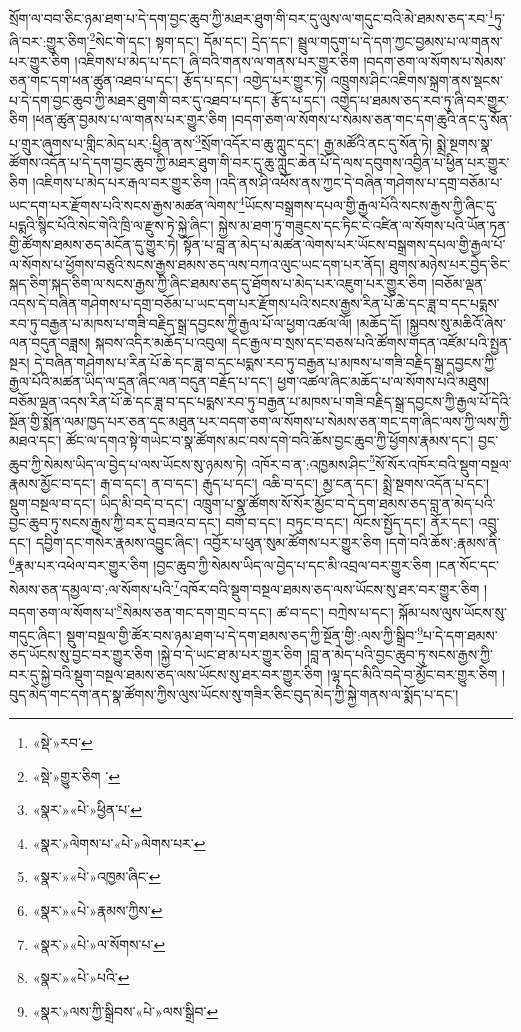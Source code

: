 སྲོག་ལ་བབ་ཅིང་ཉམ་ཐག་པ་དེ་དག་བྱང་ཆུབ་ཀྱི་མཐར་ཐུག་གི་བར་དུ་ལུས་ལ་གདུང་བའི་མེ་ཐམས་ཅད་རབ་\footnote{«སྡེ་»རབ་}ཏུ་ཞི་བར་:གྱུར་ཅིག་\footnote{«སྡེ་»གྱུར་ཅིག ་}སེང་གེ་དང་། སྟག་དང་། དོམ་དང་། དྲེད་དང་། སྦྲུལ་གདུག་པ་དེ་དག་ཀྱང་བྱམས་པ་ལ་གནས་པར་གྱུར་ཅིག །འཇིགས་པ་མེད་པ་དང་། ཞི་བའི་གནས་ལ་གནས་པར་གྱུར་ཅིག །བདག་ཅག་ལ་སོགས་པ་སེམས་ཅན་གང་དག་ཕན་ཚུན་འཐབ་པ་དང་། རྩོད་པ་དང་། འགྱེད་པར་གྱུར་ཏེ། འཁྲུགས་ཤིང་འཇིགས་སྐྲག་ནས་སྡངས་པ་དེ་དག་བྱང་ཆུབ་ཀྱི་མཐར་ཐུག་གི་བར་དུ་འཐབ་པ་དང་། རྩོད་པ་དང་། འགྱེད་པ་ཐམས་ཅད་རབ་ཏུ་ཞི་བར་གྱུར་ཅིག །ཕན་ཚུན་བྱམས་པ་ལ་གནས་པར་གྱུར་ཅིག །བདག་ཅག་ལ་སོགས་པ་སེམས་ཅན་གང་དག་ཆུའི་ནང་དུ་སོན་པ་གྲུར་ཞུགས་པ་གླིང་མེད་པར་:ཕྱིན་ནས་\footnote{«སྣར་»«པེ་»ཕྱིན་པ་}སྲོག་འདོར་བ་ཆུ་ཀླུང་དང་། རྒྱ་མཚོའི་ནང་དུ་སོན་ཏེ། སྨྲེ་སྔགས་སྣ་ཚོགས་འདོན་པ་དེ་དག་བྱང་ཆུབ་ཀྱི་མཐར་ཐུག་གི་བར་དུ་ཆུ་ཀླུང་ཆེན་པོ་དེ་ལས་དབུགས་འབྱིན་པ་ཕྱིན་པར་གྱུར་ཅིག །འཇིགས་པ་མེད་པར་རྒལ་བར་གྱུར་ཅིག །འདི་ནས་ཤི་འཕོས་ནས་ཀྱང་དེ་བཞིན་གཤེགས་པ་དགྲ་བཅོམ་པ་ཡང་དག་པར་རྫོགས་པའི་སངས་རྒྱས་མཚན་ལེགས་\footnote{«སྣར་»ལེགས་པ་«པེ་»ལེགས་པར་}ཡོངས་བསྒྲགས་དཔལ་གྱི་རྒྱལ་པོའི་སངས་རྒྱས་ཀྱི་ཞིང་དུ་པདྨའི་སྙིང་པོའི་སེང་གེའི་ཁྲི་ལ་རྫུས་ཏེ་སྐྱེ་ཞིང་། སྐྱེས་མ་ཐག་ཏུ་གཟུངས་དང་ཏིང་ངེ་འཛིན་ལ་སོགས་པའི་ཡོན་ཏན་གྱི་ཚོགས་ཐམས་ཅད་མངོན་དུ་གྱུར་ཏེ། སྟོན་པ་བླ་ན་མེད་པ་མཚན་ལེགས་པར་ཡོངས་བསྒྲགས་དཔལ་གྱི་རྒྱལ་པོ་ལ་སོགས་པ་ཕྱོགས་བཅུའི་སངས་རྒྱས་ཐམས་ཅད་ལས་བཀའ་ལུང་ཡང་དག་པར་ནོད། ཐུགས་མཉེས་པར་བྱེད་ཅིང་སྐད་ཅིག་སྐད་ཅིག་ལ་སངས་རྒྱས་ཀྱི་ཞིང་ཐམས་ཅད་དུ་ཐོགས་པ་མེད་པར་འཇུག་པར་གྱུར་ཅིག །བཅོམ་ལྡན་འདས་དེ་བཞིན་གཤེགས་པ་དགྲ་བཅོམ་པ་ཡང་དག་པར་རྫོགས་པའི་སངས་རྒྱས་རིན་པོ་ཆེ་དང་ཟླ་བ་དང་པདྨས་རབ་ཏུ་བརྒྱན་པ་མཁས་པ་གཟི་བརྗིད་སྒྲ་དབྱངས་ཀྱི་རྒྱལ་པོ་ལ་ཕྱག་འཚལ་ལོ། །མཆོད་དོ། །སྐྱབས་སུ་མཆིའོ་ཞེས་ལན་བདུན་བཟླས། སྐབས་འདིར་མཆོད་པ་འབུལ། དེང་རྒྱལ་བ་སྲས་དང་བཅས་པའི་ཚོགས་གདན་འཛོམ་པའི་སྤྱན་སྔར། དེ་བཞིན་གཤེགས་པ་རིན་པོ་ཆེ་དང་ཟླ་བ་དང་པདྨས་རབ་ཏུ་བརྒྱན་པ་མཁས་པ་གཟི་བརྗིད་སྒྲ་དབྱངས་ཀྱི་རྒྱལ་པོའི་མཚན་ཡིད་ལ་དྲན་ཞིང་ལན་བདུན་བརྗོད་པ་དང་། ཕྱག་འཚལ་ཞིང་མཆོད་པ་ལ་སོགས་པའི་མཐུས། བཅོམ་ལྡན་འདས་རིན་པོ་ཆེ་དང་ཟླ་བ་དང་པདྨས་རབ་ཏུ་བརྒྱན་པ་མཁས་པ་གཟི་བརྗིད་སྒྲ་དབྱངས་ཀྱི་རྒྱལ་པོ་དེའི་སྔོན་གྱི་སྨོན་ལམ་ཁྱད་པར་ཅན་དང་མཐུན་པར་བདག་ཅག་ལ་སོགས་པ་སེམས་ཅན་གང་དག་ཞིང་ལས་ཀྱི་ལས་ཀྱི་མཐའ་དང་། ཚོང་ལ་དགའ་སྟེ་གཡེང་བ་སྣ་ཚོགས་མང་བས་དགེ་བའི་ཆོས་བྱང་ཆུབ་ཀྱི་ཕྱོགས་རྣམས་དང་། བྱང་ཆུབ་ཀྱི་སེམས་ཡིད་ལ་བྱེད་པ་ལས་ཡོངས་སུ་ཉམས་ཏེ། འཁོར་བ་ན་:འཁྱམས་ཤིང་\footnote{«སྣར་»«པེ་»འཁྱམ་ཞིང་}སོ་སོར་འཁོར་བའི་སྡུག་བསྔལ་རྣམས་མྱོང་བ་དང་། རྒ་བ་དང་། ན་བ་དང་། རྒུད་པ་དང་། འཆི་བ་དང་། མྱ་ངན་དང་། སྨྲེ་སྔགས་འདོན་པ་དང་། སྡུག་བསྔལ་བ་དང་། ཡིད་མི་བདེ་བ་དང་། འཁྲུག་པ་སྣ་ཚོགས་སོ་སོར་མྱོང་བ་དེ་དག་ཐམས་ཅད་བླ་ན་མེད་པའི་བྱང་ཆུབ་ཏུ་སངས་རྒྱས་ཀྱི་བར་དུ་བཟའ་བ་དང་། བགོ་བ་དང་། བཏུང་བ་དང་། ལོངས་སྤྱོད་དང་། ནོར་དང་། འབྲུ་དང་། དབྱིག་དང་གསེར་རྣམས་འབྱུང་ཞིང་། འབྱོར་པ་ཕུན་སུམ་ཚོགས་པར་གྱུར་ཅིག །དགེ་བའི་ཆོས་:རྣམས་ནི་\footnote{«སྣར་»«པེ་»རྣམས་ཀྱིས་}རྣམ་པར་འཕེལ་བར་གྱུར་ཅིག །བྱང་ཆུབ་ཀྱི་སེམས་ཡིད་ལ་བྱེད་པ་དང་མི་འབྲལ་བར་གྱུར་ཅིག །ངན་སོང་དང་སེམས་ཅན་དམྱལ་བ་:ལ་སོགས་པའི་\footnote{«སྣར་»«པེ་»ལ་སོགས་པ་}འཁོར་བའི་སྡུག་བསྔལ་ཐམས་ཅད་ལས་ཡོངས་སུ་ཐར་བར་གྱུར་ཅིག །བདག་ཅག་ལ་སོགས་པ་\footnote{«སྣར་»«པེ་»པའི་}སེམས་ཅན་གང་དག་གྲང་བ་དང་། ཚ་བ་དང་། བཀྲེས་པ་དང་། སྐོམ་པས་ལུས་ཡོངས་སུ་གདུང་ཞིང་། སྡུག་བསྔལ་གྱི་ཚོར་བས་ཉམ་ཐག་པ་དེ་དག་ཐམས་ཅད་ཀྱི་སྔོན་གྱི་:ལས་ཀྱི་སྒྲིབ་\footnote{«སྣར་»ལས་ཀྱི་སྒྲིབས་«པེ་»ལས་སྒྲིབ་}པ་དེ་དག་ཐམས་ཅད་ཡོངས་སུ་བྱང་བར་གྱུར་ཅིག །སྐྱེ་བ་དེ་ཡང་ཐ་མ་པར་གྱུར་ཅིག །བླ་ན་མེད་པའི་བྱང་ཆུབ་ཏུ་སངས་རྒྱས་ཀྱི་བར་དུ་སྐྱེ་བའི་སྡུག་བསྔལ་ཐམས་ཅད་ལས་ཡོངས་སུ་ཐར་བར་གྱུར་ཅིག །ལྷ་དང་མིའི་བདེ་བ་མྱོང་བར་གྱུར་ཅིག །བུད་མེད་གང་དག་ནད་སྣ་ཚོགས་ཀྱིས་ལུས་ཡོངས་སུ་གཟིར་ཅིང་བུད་མེད་ཀྱི་སྐྱེ་གནས་ལ་སྨོད་པ་དང་། 